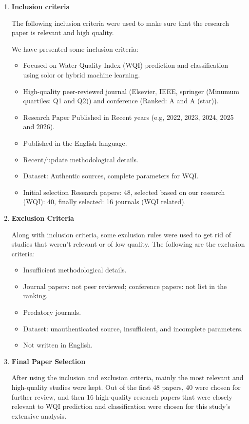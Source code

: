\documentclass[conference]{IEEEtran}
\begin{document}
\begin{enumerate}[{(1)}]
\item \textbf{Inclusion criteria}

The following inclusion criteria were used to make sure that the research paper is relevant and high quality.

We have presented some inclusion criteria:

\begin{itemize}
    \item Focused on Water Quality Index (WQI) prediction and classification using solor or hybrid  machine learning.
    \item High-quality peer-reviewed journal (Elsevier, IEEE, springer (Minumum quartiles: Q1 and Q2)) and conference (Ranked: A and A (star)).
    \item Research Paper Published in Recent years (e.g, 2022, 2023, 2024, 2025 and 2026).
    \item Published in the English language.
    \item Recent/update methodological details.
    \item Dataset: Authentic sources, complete parameters for WQI.  
    \item Initial selection Research papers: 48, selected based on our research (WQI): 40, finally selected: 16 journals (WQI related).
    
\end{itemize}

\item \textbf{Exclusion Criteria}

Along with inclusion criteria, some exclusion rules were used to get rid of studies that weren't relevant or of low quality. The following are the exclusion criteria:
\begin{itemize}
    \item Insufficient methodological details.
    \item Journal papers: not peer reviewed; conference papers: not list in the ranking. 
    \item Predatory journals.
    \item Dataset: unauthenticated source, insufficient, and incomplete parameters.
    \item Not written in English.
    
\end{itemize}

\item \textbf{Final Paper Selection}

After using the inclusion and exclusion criteria, mainly the most relevant and high-quality studies were kept. Out of the first 48 papers, 40 were chosen for further review, and then 16 high-quality research papers that were closely relevant to WQI prediction and classification were chosen for this study's extensive analysis.




\end{enumerate}
\end{document}
